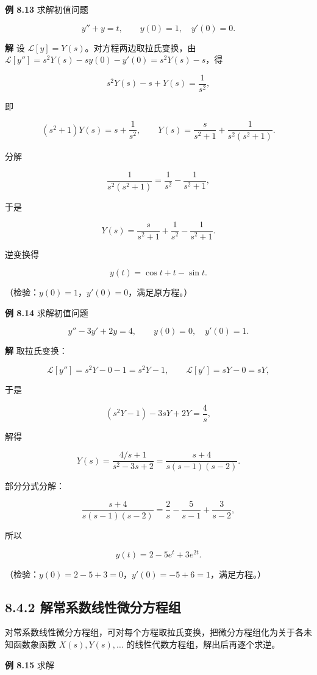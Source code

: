 \textbf{例 8.13} 求解初值问题

\[
y''+y=t,\qquad y(0)=1,\quad y'(0)=0 .
\]

\textbf{解} 设 \(\mathcal{L}[y]=Y(s)\)。对方程两边取拉氏变换，由
\(\mathcal{L}[y'']=s^2Y(s)-sy(0)-y'(0)=s^2Y(s)-s\)，得

\[
s^2Y(s)-s+Y(s)=\frac{1}{s^2},
\]

即

\[
(s^2+1)Y(s)=s+\frac{1}{s^2},\qquad
Y(s)=\frac{s}{s^2+1}+\frac{1}{s^2(s^2+1)}.
\]

分解

\[
\frac{1}{s^2(s^2+1)}=\frac{1}{s^2}-\frac{1}{s^2+1},
\]

于是

\[
Y(s)=\frac{s}{s^2+1}+\frac{1}{s^2}-\frac{1}{s^2+1}.
\]

逆变换得

\[
y(t)=\cos t+t-\sin t .
\]

（检验：\(y(0)=1\)，\(y'(0)=0\)，满足原方程。）

\textbf{例 8.14} 求解初值问题

\[
y''-3y'+2y=4,\qquad y(0)=0,\quad y'(0)=1 .
\]

\textbf{解} 取拉氏变换：

\[
\mathcal{L}[y'']=s^2Y-0-1=s^2Y-1,\qquad
\mathcal{L}[y']=sY-0=sY,
\]

于是

\[
(s^2Y-1)-3sY+2Y=\frac{4}{s},
\]

解得

\[
Y(s)=\frac{4/s+1}{s^2-3s+2}=\frac{s+4}{s(s-1)(s-2)} .
\]

部分分式分解：

\[
\frac{s+4}{s(s-1)(s-2)}=\frac{2}{s}-\frac{5}{s-1}+\frac{3}{s-2},
\]

所以

\[
y(t)=2-5e^{t}+3e^{2t}.
\]

（检验：\(y(0)=2-5+3=0\)，\(y'(0)=-5+6=1\)，满足方程。）

\subsection{8.4.2
解常系数线性微分方程组}\label{ux89e3ux5e38ux7cfbux6570ux7ebfux6027ux5faeux5206ux65b9ux7a0bux7ec4}

对常系数线性微分方程组，可对每个方程取拉氏变换，把微分方程组化为关于各未知函数象函数
\(X(s),Y(s),\ldots\) 的线性代数方程组，解出后再逐个求逆。

\textbf{例 8.15} 求解

